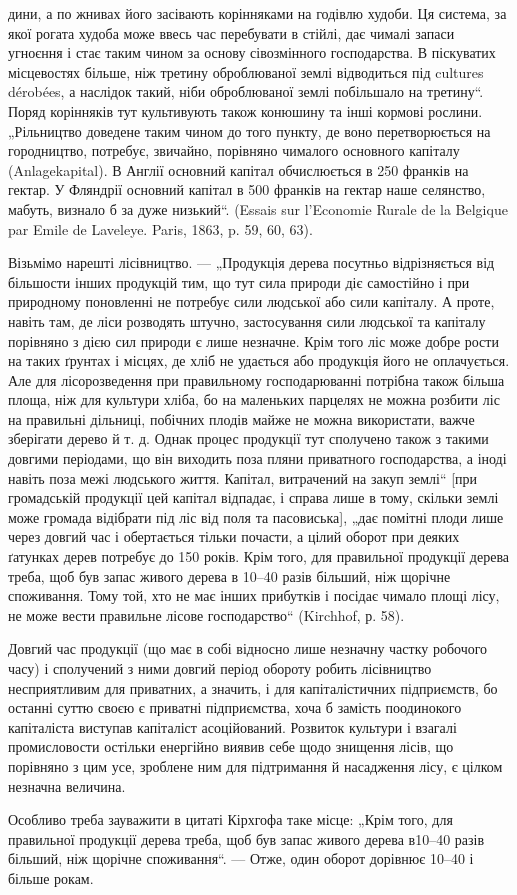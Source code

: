дини, а по жнивах його засівають корінняками на годівлю худоби. Ця система, за якої рогата худоба
може ввесь час перебувати в стійлі, дає чималі запаси угноєння і стає таким чином за основу
сівозмінного господарства. В піскуватих місцевостях більше, ніж третину оброблюваної землі
відводиться під cultures dérobées, а наслідок такий, ніби оброблюваної землі побільшало на третину“.
Поряд корінняків тут культивують також конюшину та інші кормові рослини. „Рільництво доведене таким
чином до того пункту, де воно перетворюється на городництво, потребує, звичайно, порівняно чималого
основного капіталу (Anlagekapital). В Англії основний капітал обчислюється в 250 франків на гектар.
У Фляндрії основний капітал в 500 франків на гектар наше селянство, мабуть, визнало б за дуже
низький“. (Essais sur l’Economie Rurale de la Belgique par Emile de Laveleye. Paris, 1863, p. 59,
60, 63).

Візьмімо нарешті лісівництво. — „Продукція дерева посутньо відрізняється від більшости інших
продукцій тим, що тут сила природи діє самостійно і при природному поновленні не потребує сили
людської або сили капіталу. А проте, навіть там, де ліси розводять штучно, застосування сили
людської та капіталу порівняно з дією сил природи є лише незначне. Крім того ліс може добре рости на
таких ґрунтах і місцях, де хліб не удається або продукція його не оплачується. Але для
лісорозведення при правильному господарюванні потрібна також більша площа, ніж для культури хліба,
бо на маленьких парцелях не можна розбити ліс на правильні дільниці, побічних плодів майже не можна
використати, важче зберігати дерево й т. д. Однак процес продукції тут сполучено також з такими
довгими періодами, що він виходить поза пляни приватного господарства, а іноді навіть поза межі
людського життя. Капітал,
витрачений на закуп землі“ [при громадській продукції цей капітал відпадає, і справа лише в тому,
скільки землі може громада відібрати під ліс від поля та пасовиська], „дає помітні плоди лише через
довгий час і обертається тільки почасти, а цілий оборот при деяких ґатунках дерев потребує до 150
років. Крім того, для правильної продукції дерева треба, щоб був запас живого дерева в 10–40 разів
більший, ніж щорічне споживання. Тому той, хто не має інших прибутків і посідає чимало площі лісу,
не може вести правильне лісове господарство“ (Kirchhof, р. 58).

Довгий час продукції (що має в собі відносно лише незначну частку робочого часу) і сполучений з ними
довгий період обороту робить лісівництво несприятливим для приватних, а значить, і для
капіталістичних підприємств, бо останні суттю своєю є приватні підприємства, хоча б замість
поодинокого капіталіста виступав капіталіст асоційований. Розвиток культури і взагалі промисловости
остільки енергійно виявив себе щодо знищення лісів, що порівняно з цим усе, зроблене ним для
підтримання й насадження лісу, є цілком незначна величина.

Особливо треба зауважити в цитаті Кірхгофа таке місце: „Крім того, для правильної продукції дерева
треба, щоб був запас живого дерева в10–40 разів більший, ніж щорічне споживання“. — Отже, один
оборот дорівнює 10–40 і більше рокам.
